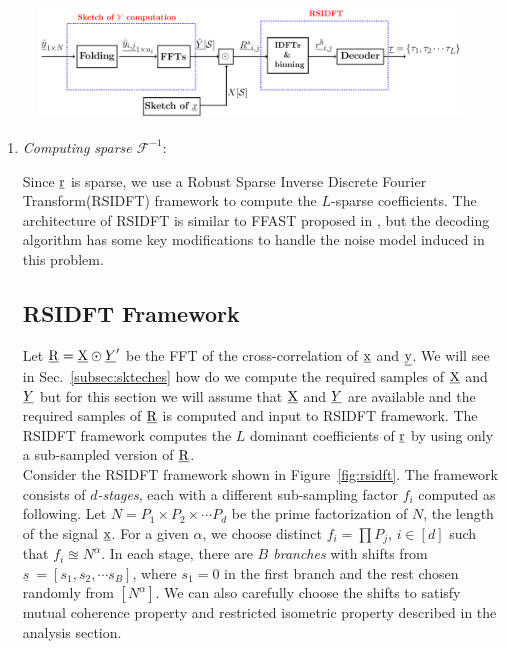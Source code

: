 \begin{figure}[h!]
	\begin{center}
		\includegraphics[height=3cm]{Figures/notional_diag} 
	\end{center}	   
	\caption{}\label{fig:notional}
	\vspace{5 pt}
\end{figure}

\begin{enumerate}
\item[\RNum{1}] \textit{Computing sparse $\mathcal{F}^{-1}$}:	

Since $\underline{\mathrm{r}}$ is sparse, we use a Robust Sparse Inverse  Discrete Fourier Transform(RSIDFT) framework to compute the $L$-sparse coefficients. The architecture of RSIDFT is similar to FFAST proposed in \cite{pawar2014robust}, but the decoding algorithm has some key modifications to handle the noise model induced in this problem.
 
\subsection{RSIDFT Framework} 	
\label{subsec:RSIDFT}	
	  Let $ \underline{\mathrm{R}}  =  \underline{\mathrm{X}} \odot \underline{Y}'$ be the FFT of the cross-correlation of $\underline{\mathrm{x}}$ and $\underline{\mathrm{y}}$. We will see in Sec.~\ref{subsec:skteches} how do we compute the required samples of $\underline{\mathrm{X}}$ and $\underline{Y}$ but for this section we will assume that $\underline{\mathrm{X}}$ and $\underline{Y}$ are available and the required samples of $\underline{\mathrm{R}}$ is computed and input to RSIDFT framework. The RSIDFT framework computes the $L$ dominant coefficients of $\underline{\mathrm{r}}$ by using only a sub-sampled version of $\underline{\mathrm{R}}$.\\
	  	  
Consider the RSIDFT framework shown in Figure~\ref{fig:rsidft}. The framework consists of {\it $d$-stages}, each with a different sub-sampling factor $f_i$ computed as following. Let $N = P_1 \times P_2 \times \cdots P_d$ be the prime factorization of $N$, the length of the signal $\underline{\mathrm{x}}$. For a given $\alpha$, we choose distinct $f_i = \prod P_j$, $i \in [d]$ such that $f_i \approxeq N^{\alpha} $. In each stage, there are {\it $B$ branches} with shifts from $\underline{s}\ = [s_1, s_2, \cdots s_B] $, where $s_1 =0$ in the first branch and the rest chosen randomly from $[N^{\alpha}]$. We can also carefully choose the shifts to satisfy mutual coherence property and restricted isometric property described in the analysis section.\\
	   

\end{enumerate}
